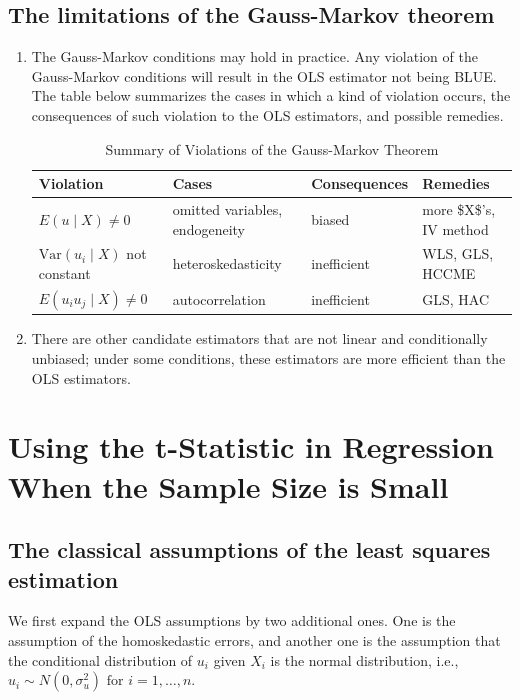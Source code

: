 \documentclass[a4paper,11pt]{article}
\newcommand{\var}{\mathrm{Var}}
\begin{document}
\subsection{The limitations of the Gauss-Markov theorem}
\label{sec:orgc0dd810}
\begin{enumerate}
\item The Gauss-Markov conditions may hold in practice. Any violation of
the Gauss-Markov conditions will result in the OLS estimator not
being BLUE. The table below summarizes the cases in which a kind of
violation occurs, the consequences of such violation to the OLS
estimators, and possible remedies.

\begin{table}[htbp]
\caption{Summary of Violations of the Gauss-Markov Theorem}
\centering
\small
\begin{tabular}{p{4cm}|p{5.5cm}|p{2.5cm}|p{3.4cm}}
\toprule
Violation & Cases & Consequences & Remedies\\
\midrule
\(E(u \mid X) \neq 0\) & omitted variables, endogeneity & biased & more \$X\$'s, IV method\\
\(\var(u_i\mid X)\) not constant & heteroskedasticity & inefficient & WLS, GLS, HCCME\\
\(E(u_{i}u_{j}\mid X) \neq 0\) & autocorrelation & inefficient & GLS, HAC\\
\bottomrule
\end{tabular}
\end{table}

\item There are other candidate estimators that are not linear and
conditionally unbiased; under some conditions, these estimators are
more efficient than the OLS estimators.
\end{enumerate}

\section{Using the t-Statistic in Regression When the Sample Size is Small}
\label{sec:org45ea3d1}
\subsection{The classical assumptions of the least squares estimation}
\label{sec:org581dc01}
We first expand the OLS assumptions by two additional ones. One is the
assumption of the homoskedastic errors, and another one is the
assumption that the conditional distribution of \(u_i\) given \(X_i\) is
the normal distribution, i.e., \(u_i \sim N(0,
\sigma^2_u) \text{ for } i = 1, \ldots, n\). 
\end{document}
